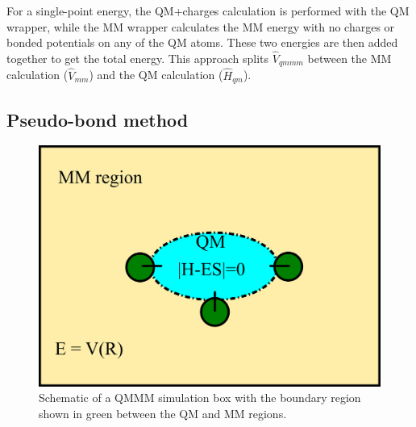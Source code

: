\documentclass[12pt]{report}
\begin{document}
For a single-point energy, the QM+charges calculation is performed with the QM
wrapper, while the MM wrapper calculates the MM energy with no charges or
bonded potentials on any of the QM atoms.
These two energies are then added together to get the total energy.
This approach splits $\hat V_{qmmm}$ between the MM calculation
($\hat V_{mm}$) and the QM calculation ($\hat H_{qm}$).

\subsection{Pseudo-bond method}

\begin{figure}[hbt]
 \centering
 \includegraphics[scale=0.50]{../doc/images/QMMM_2.png}
 \caption{
 Schematic of a QMMM simulation box with the boundary region shown in
 green between the QM and MM regions.}
 \label{fig:QMMM2}
\end{figure}
\end{document}
